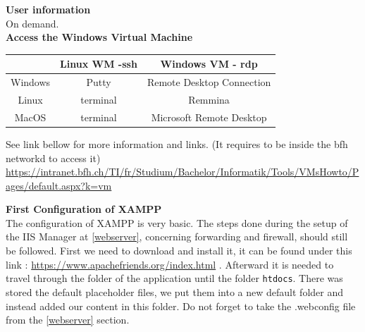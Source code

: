 \documentclass{scrbook}
\begin{document}
\textbf{User information} \\
On demand.\\

\textbf{Access the Windows Virtual Machine}\\
\begin{center}
  \begin{tabular}{|c|c|c|}
    \hline
     & Linux WM -ssh & Windows VM - rdp \\
    \hline
    Windows & Putty & Remote Desktop Connection \\
    \hline
    Linux & terminal & Remmina \\
    \hline
    MacOS & terminal & Microsoft Remote Desktop \\
    \hline
  \end{tabular}
\end{center}

See link bellow for more information and links. (It requires to be inside the bfh networkd to access it)
\url{https://intranet.bfh.ch/TI/fr/Studium/Bachelor/Informatik/Tools/VMsHowto/Pages/default.aspx?k=vm}

\textbf{First Configuration of XAMPP}\\
The configuration of XAMPP is very basic. The steps done during the setup of the IIS Manager at \ref{webserver}, concerning forwarding and firewall, should still be followed. First we need to download and install it, it can be found under this link : \url{https://www.apachefriends.org/index.html} . Afterward it is needed to travel through the folder of the application until the folder 
\texttt{htdocs}. There was stored the default placeholder files, we put them into a new default folder and instead added our content in this folder. Do not forget to take the .webconfig file from the \ref{webserver} section.
\end{document}

